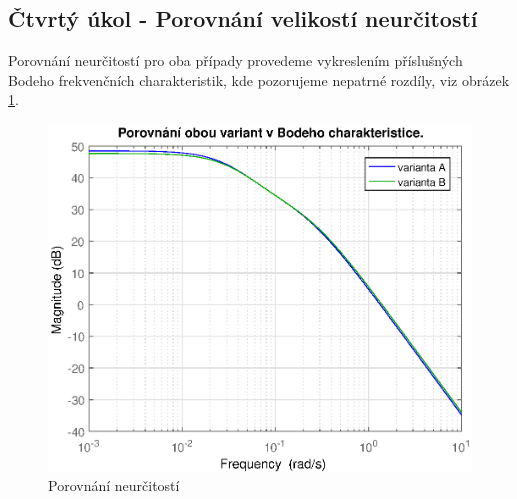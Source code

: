 \documentclass[a4paper,11pt]{article}
\begin{document}
\subsection{Čtvrtý úkol - Porovnání velikostí neurčitostí}
Porovnání neurčitostí pro oba případy provedeme vykreslením příslušných Bodeho frekvenčních charakteristik, kde pozorujeme nepatrné rozdíly, viz obrázek \ref{fig:porovnani_neurcitosti}.
\begin{figure}[htbp]
	\begin{center}
	\includegraphics[scale = 1.0]{obrazky/porovnaniNeurcitosti.eps}
	\caption{Porovnání neurčitostí}
	\label{fig:porovnani_neurcitosti}
	\end{center}
\end{figure}


\newpage
\end{document}
